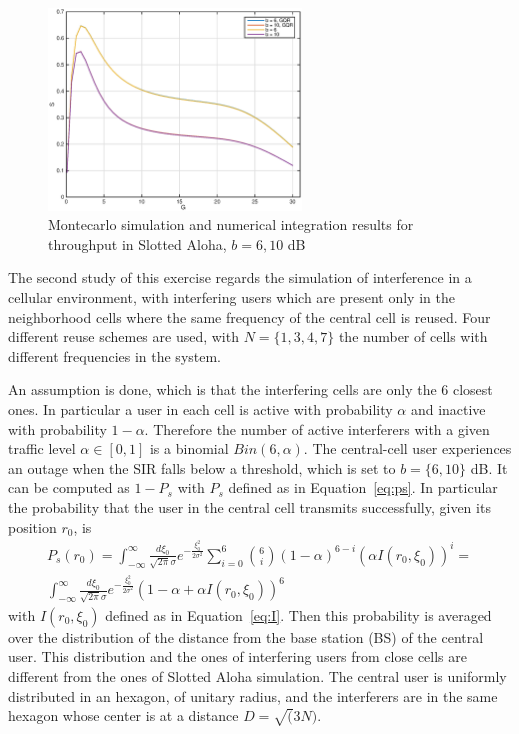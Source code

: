 \documentclass[10pt]{article}
\begin{document}
\begin{figure}[h!]
  \centering
  \includegraphics[width = 0.6\textwidth]{aloha_GQR_S}
  \caption{Montecarlo simulation and numerical integration results for throughput in Slotted Aloha, $b = 6, 10$ dB}
  \label{fig:aloha_GQR_S}
\end{figure}

The second study of this exercise regards the simulation of interference in a cellular environment, with interfering users which are present only in the neighborhood cells where the same frequency of the central cell is reused. Four different reuse schemes are used, with $N = \{1, 3, 4, 7\}$ the number of cells with different frequencies in the system.

An assumption is done, which is that the interfering cells are only the 6 closest ones. In particular a user in each cell is active with probability $\alpha$ and inactive with probability $1-\alpha$. Therefore the number of active interferers with a given traffic level $\alpha \in [0,1]$ is a binomial $Bin(6, \alpha)$. The central-cell user experiences an outage when the SIR falls below a threshold, which is set to $b = \{6, 10\}$ dB. It can be computed as $1 - P_{s}$ with $P_{s}$ defined as in Equation~\eqref{eq:ps}. In particular the probability that the user in the central cell transmits successfully, given its position $r_0$, is 
\begin{eqnarray}
  P_s(r_0) = \int_{-\infty}^{\infty} \frac{d\xi_0}{\sqrt{2\pi}\sigma} e^{-\frac{\xi_0^2}{2\sigma^2}} 
  \sum_{i = 0}^{6} \binom{6}{i} (1 - \alpha)^{6-i} \left(\alpha I(r_0, \xi_0) \right)^{i} = \\
  \int_{-\infty}^{\infty} \frac{d\xi_0}{\sqrt{2\pi}\sigma} e^{-\frac{\xi_0^2}{2\sigma^2}} (1 - \alpha + \alpha I(r_0, \xi_0))^6
  \label{eq:succ_cell}
\end{eqnarray}
with $I(r_0, \xi_0)$ defined as in Equation~\eqref{eq:I}. Then this probability is averaged over the distribution of the distance from the base station (BS) of the central user. This distribution and the ones of interfering users from close cells are different from the ones of Slotted Aloha simulation. The central user is uniformly distributed in an hexagon, of unitary radius, and the interferers are in the same hexagon whose center is at a distance $D = \sqrt(3N)$. 
\end{document}
